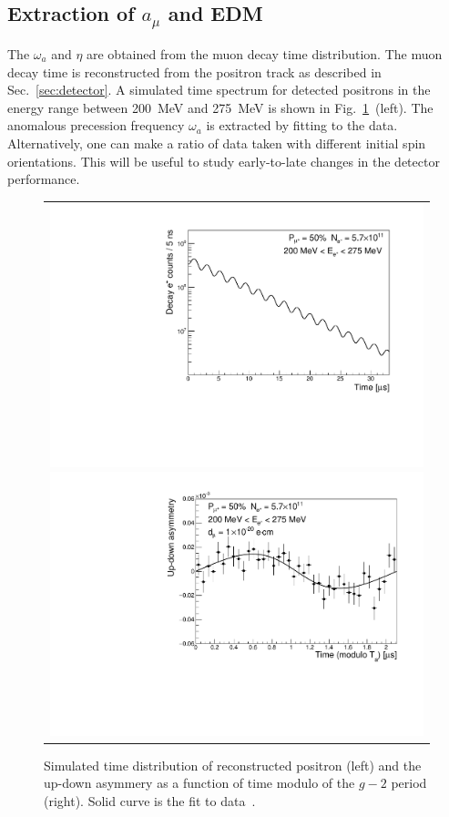 \subsection{Extraction of $a_{\mu}$ and EDM}\label{sec:Sensitivities} 

The $\omega_a$ and $\eta$ are obtained from the muon decay time distribution.
The muon decay time is reconstructed from the positron track as described in Sec.~\ref{sec:detector}.
A simulated time spectrum for detected positrons in the energy range 
between 200~MeV and 275~MeV is shown in Fig.~\ref{fig:Wiggle}~(left).
The anomalous precession frequency $\omega_a$ is extracted by fitting to the data. 
Alternatively, one can make a ratio of 
data taken with different initial spin orientations.
This will be useful to study early-to-late changes in the detector performance.

\begin{figure}[t]
  \centering
    \begin{tabular}{c}

      \begin{minipage}{0.5\hsize}
        \centering
        \includegraphics[width=0.7\linewidth, angle=270, bb=20 255 428 822]{Fig/WigglePlot.pdf}
      \end{minipage}

      \begin{minipage}{0.5\hsize}
        \centering
        \includegraphics[width=0.7\linewidth, angle=270, bb=20 255 428 822]{Fig/EDMModuloPlot_20_40.pdf}
      \end{minipage}
    \end{tabular}

    \caption{Simulated time distribution of reconstructed positron (left) 
      and the up-down asymmery as a function of time modulo of the $g-2$ period (right).
      Solid curve is the fit to data~\cite{TDRsummarypaper}.}
    \label{fig:Wiggle}
\end{figure}

